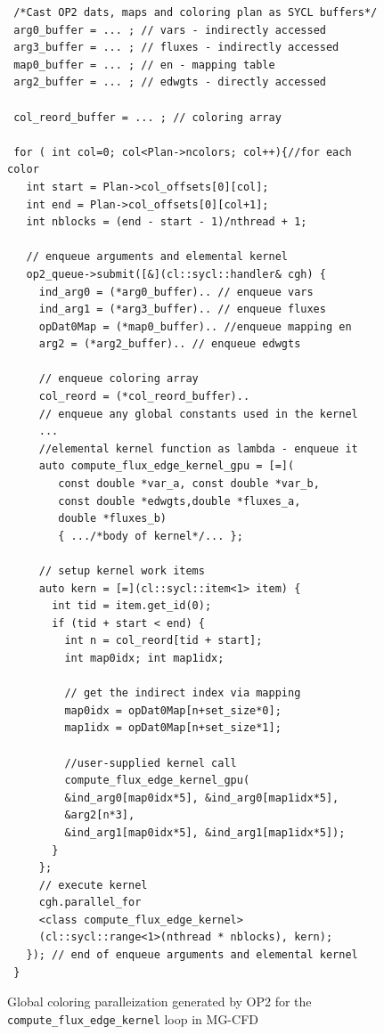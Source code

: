 \documentclass[runningheads]{llncs}
\begin{document}
\begin{figure}[!t]
\begin{verbatim}
 /*Cast OP2 dats, maps and coloring plan as SYCL buffers*/
 arg0_buffer = ... ; // vars - indirectly accessed 
 arg3_buffer = ... ; // fluxes - indirectly accessed 
 map0_buffer = ... ; // en - mapping table
 arg2_buffer = ... ; // edwgts - directly accessed  

 col_reord_buffer = ... ; // coloring array

 for ( int col=0; col<Plan->ncolors; col++){//for each color
   int start = Plan->col_offsets[0][col];
   int end = Plan->col_offsets[0][col+1];
   int nblocks = (end - start - 1)/nthread + 1;
   
   // enqueue arguments and elemental kernel
   op2_queue->submit([&](cl::sycl::handler& cgh) {
     ind_arg0 = (*arg0_buffer).. // enqueue vars
     ind_arg1 = (*arg3_buffer).. // enqueue fluxes
     opDat0Map = (*map0_buffer).. //enqueue mapping en 
     arg2 = (*arg2_buffer).. // enqueue edwgts
     
     // enqueue coloring array
     col_reord = (*col_reord_buffer)..     
     // enqueue any global constants used in the kernel
     ...
     //elemental kernel function as lambda - enqueue it
     auto compute_flux_edge_kernel_gpu = [=]( 
        const double *var_a, const double *var_b,
        const double *edwgts,double *fluxes_a, 
        double *fluxes_b) 
        { .../*body of kernel*/... }; 
        
     // setup kernel work items
     auto kern = [=](cl::sycl::item<1> item) {  
       int tid = item.get_id(0);
       if (tid + start < end) {
         int n = col_reord[tid + start]; 
         int map0idx; int map1idx;

         // get the indirect index via mapping
         map0idx = opDat0Map[n+set_size*0]; 
         map1idx = opDat0Map[n+set_size*1];

         //user-supplied kernel call
         compute_flux_edge_kernel_gpu(
         &ind_arg0[map0idx*5], &ind_arg0[map1idx*5], 
         &arg2[n*3], 
         &ind_arg1[map0idx*5], &ind_arg1[map1idx*5]);
       }
     };   
     // execute kernel 
     cgh.parallel_for
     <class compute_flux_edge_kernel>
     (cl::sycl::range<1>(nthread * nblocks), kern);
   }); // end of enqueue arguments and elemental kernel
 }               
\end{verbatim}
\vspace{-20pt}\caption{Global coloring paralleization generated by OP2 for the
\texttt{compute\_flux\_edge\_kernel} loop in MG-CFD}
\label{fig/gblcoloring}\vspace{-20pt}
\end{figure}
\end{document}
